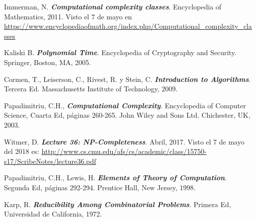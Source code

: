 \begin{thebibliography}{IEEE}

 Immerman, N. \textbf{\textit{Computational complexity classes}}. Encyclopedia of Mathematics, 2011. Visto el 7 de mayo en \url{https://www.encyclopediaofmath.org/index.php/Computational_complexity_classes}

 Kaliski B.  \textbf{\textit{Polynomial Time}}. Encyclopedia of Cryptography and Security. Springer, Boston, MA, 2005.

 Cormen, T., Leiserson, C., Rivest, R. y Stein, C. \textbf{\textit{Introduction to Algorithms}}. Tercera Ed. Massachusetts Institute of Technology, 2009.

 Papadimitriu, C.H., \textbf{\textit{Computational Complexity}}. Encyclopedia of Computer Science, Cuarta Ed, páginas 260-265. John Wiley and Sons Ltd. Chichester, UK, 2003.


 Witmer, D. \textbf{\textit{Lecture 36: NP-Completeness}}. Abril, 2017. Visto el 7 de mayo del 2018 es: \url{http://www.cs.cmu.edu/afs/cs/academic/class/15750-s17/ScribeNotes/lecture36.pdf}


 Papadimitriu, C.H., Lewis, H. \textbf{\textit{Elements of Theory of Computation}}. Segunda Ed, páginas 292-294. Prentice Hall, New Jersey, 1998.

 Karp, R. \textbf{\textit{Reducibility Among Combinatorial Problems}}. Primera Ed, Universidad de California, 1972.

\end{thebibliography}

